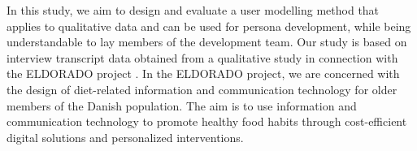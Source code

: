 
In this study, we aim to design and evaluate a user modelling method that applies to qualitative data and can be used for persona development, while being understandable to lay members of the development team. Our study is based on interview transcript data obtained from a qualitative study in connection with the ELDORADO project \citep{CopenhagenU2018}. In the ELDORADO project, we are concerned with the design of diet-related information and communication technology for older members of the Danish population. The aim is to use information and communication technology to promote healthy food habits through cost-efficient digital solutions and personalized interventions.









